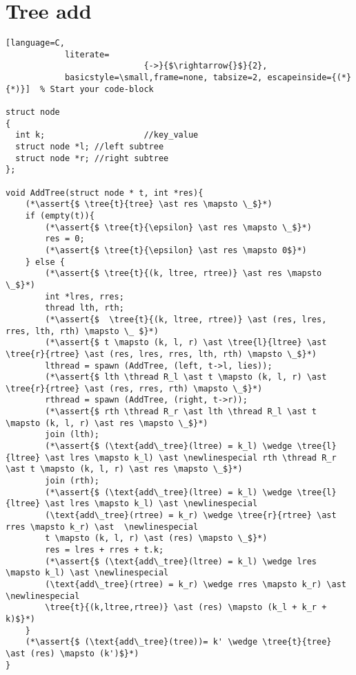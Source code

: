 \documentclass[8pt]{article}
\newcommand{\thread}{\ocircle \hspace{-1ex} \rightarrow}
\newcommand{\assert}[1]{\textcolor{blue}{ \{ #1 \}  } }
\newcommand{\tree}[2]{#1 \rightarrowtail #2}
\newcommand{\newlinespecial}{\newline \hphantom{100pt}}
\begin{document}
\section{Tree add}
\begin{lstlisting}[language=C,
			literate=
               				{->}{$\rightarrow{}$}{2},
			basicstyle=\small,frame=none, tabsize=2, escapeinside={(*}{*)}]  % Start your code-block

struct node
{
  int k;					//key_value
  struct node *l; //left subtree
  struct node *r; //right subtree
};

void AddTree(struct node * t, int *res){
	(*\assert{$ \tree{t}{tree} \ast res \mapsto \_$}*)
	if (empty(t)){
		(*\assert{$ \tree{t}{\epsilon} \ast res \mapsto \_$}*)
		res = 0;
		(*\assert{$ \tree{t}{\epsilon} \ast res \mapsto 0$}*)
	} else {
		(*\assert{$ \tree{t}{(k, ltree, rtree)} \ast res \mapsto \_$}*)
		int *lres, rres;
		thread lth, rth;
		(*\assert{$  \tree{t}{(k, ltree, rtree)} \ast (res, lres, rres, lth, rth) \mapsto \_ $}*)
		(*\assert{$ t \mapsto (k, l, r) \ast \tree{l}{ltree} \ast \tree{r}{rtree} \ast (res, lres, rres, lth, rth) \mapsto \_$}*)
		lthread = spawn (AddTree, (left, t->l, lies));
		(*\assert{$ lth \thread R_l \ast t \mapsto (k, l, r) \ast \tree{r}{rtree} \ast (res, rres, rth) \mapsto \_$}*)
		rthread = spawn (AddTree, (right, t->r));
		(*\assert{$ rth \thread R_r \ast lth \thread R_l \ast t \mapsto (k, l, r) \ast res \mapsto \_$}*)
		join (lth);
		(*\assert{$ (\text{add\_tree}(ltree) = k_l) \wedge \tree{l}{ltree} \ast lres \mapsto k_l) \ast \newlinespecial rth \thread R_r \ast t \mapsto (k, l, r) \ast res \mapsto \_$}*)
		join (rth);
		(*\assert{$ (\text{add\_tree}(ltree) = k_l) \wedge \tree{l}{ltree} \ast lres \mapsto k_l) \ast \newlinespecial
		(\text{add\_tree}(rtree) = k_r) \wedge \tree{r}{rtree} \ast rres \mapsto k_r) \ast  \newlinespecial
		t \mapsto (k, l, r) \ast (res) \mapsto \_$}*)
		res = lres + rres + t.k;
		(*\assert{$ (\text{add\_tree}(ltree) = k_l) \wedge lres \mapsto k_l) \ast \newlinespecial
		(\text{add\_tree}(rtree) = k_r) \wedge rres \mapsto k_r) \ast  \newlinespecial
		\tree{t}{(k,ltree,rtree)} \ast (res) \mapsto (k_l + k_r + k)$}*)
	} 	
	(*\assert{$ (\text{add\_tree}(tree))= k' \wedge \tree{t}{tree} \ast (res) \mapsto (k')$}*)
}		

\end{lstlisting}


\end{document}
